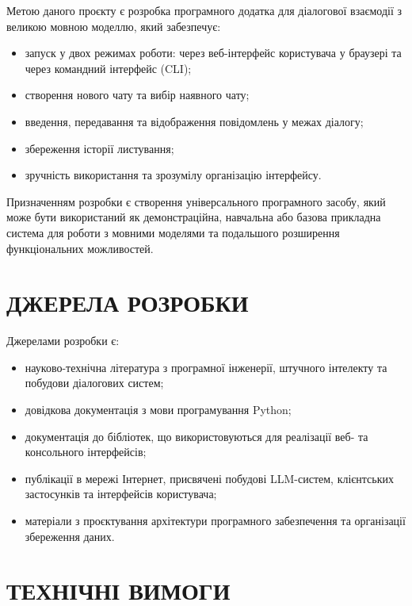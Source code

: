 \documentclass[12pt,a4paper]{article}
\begin{document}
    Метою даного проєкту є розробка програмного додатка для діалогової взаємодії
    з великою мовною моделлю, який забезпечує:

    \begin{itemize}
        \item запуск у двох режимах роботи: через веб-інтерфейс користувача у браузері та через командний інтерфейс (CLI);
        \item створення нового чату та вибір наявного чату;
        \item введення, передавання та відображення повідомлень у межах діалогу;
        \item збереження історії листування;
        \item зручність використання та зрозумілу організацію інтерфейсу.
    \end{itemize}

    Призначенням розробки є створення універсального програмного засобу,
    який може бути використаний як демонстраційна, навчальна або базова прикладна система
    для роботи з мовними моделями та подальшого розширення функціональних можливостей.

    \section{ДЖЕРЕЛА РОЗРОБКИ}

    Джерелами розробки є:

    \begin{itemize}
        \item науково-технічна література з програмної інженерії, штучного інтелекту та побудови діалогових систем;
        \item довідкова документація з мови програмування Python;
        \item документація до бібліотек, що використовуються для реалізації веб- та консольного інтерфейсів;
        \item публікації в мережі Інтернет, присвячені побудові LLM-систем, клієнтських застосунків та інтерфейсів користувача;
        \item матеріали з проєктування архітектури програмного забезпечення та організації збереження даних.
    \end{itemize}

    \section{ТЕХНІЧНІ ВИМОГИ}
\end{document}
